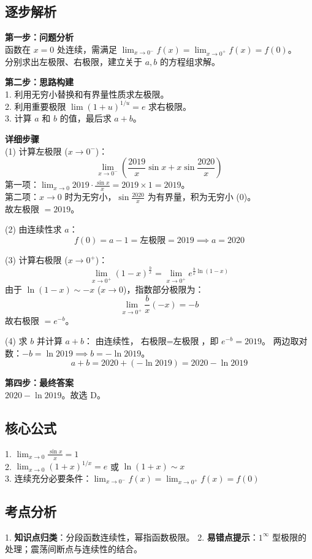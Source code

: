 \documentclass[10pt, a4paper]{ctexart}
\newcommand{\analysisheader}{
    \vspace{0.2cm}
    \noindent{\color{red}\rule[0.5ex]{\linewidth}{0.5pt}} %
    \vspace{0.1cm}
}
\begin{document}
\analysisheader
{\color{red}
\subsection*{逐步解析}
\textbf{第一步：问题分析} \\
函数在 $x=0$ 处连续，需满足 $\lim_{x\to 0^-} f(x) = \lim_{x\to 0^+} f(x) = f(0)$。 \\
分别求出左极限、右极限，建立关于 $a, b$ 的方程组求解。

\textbf{第二步：思路构建} \\
1. 利用无穷小替换和有界量性质求左极限。 \\
2. 利用重要极限 $\lim (1+u)^{1/u} = e$ 求右极限。 \\
3. 计算 $a$ 和 $b$ 的值，最后求 $a+b$。

\textbf{详细步骤} \\
(1) 计算左极限 ($x \to 0^-$)：
\[ \lim_{x \to 0^-} \left( \frac{2019}{x} \sin x + x \sin \frac{2020}{x} \right) \]
第一项：$\lim_{x \to 0} 2019 \cdot \frac{\sin x}{x} = 2019 \times 1 = 2019$。 \\
第二项：$x \to 0$ 时为无穷小，$\sin \frac{2020}{x}$ 为有界量，积为无穷小 (0)。 \\
故左极限 $= 2019$。

(2) 由连续性求 $a$：
\[ f(0) = a - 1 = \text{左极限} = 2019 \implies a = 2020 \]

(3) 计算右极限 ($x \to 0^+$)：
\[ \lim_{x \to 0^+} (1 - x)^{\frac{b}{x}} = \lim_{x \to 0^+} e^{\frac{b}{x} \ln(1-x)} \]
由于 $\ln(1-x) \sim -x$ ($x \to 0$)，指数部分极限为：
\[ \lim_{x \to 0^+} \frac{b}{x} (-x) = -b \]
故右极限 $= e^{-b}$。

(4) 求 $b$ 并计算 $a+b$：
由连续性，$\text{右极限} = \text{左极限}$，即 $e^{-b} = 2019$。
两边取对数：$-b = \ln 2019 \implies b = -\ln 2019$。
\[ a + b = 2020 + (-\ln 2019) = 2020 - \ln 2019 \]

\textbf{第四步：最终答案} \\
$2020 - \ln 2019$。故选 D。

\subsection*{核心公式}
1. $\lim_{x\to 0} \frac{\sin x}{x} = 1$ \\
2. $\lim_{x\to 0} (1+x)^{1/x} = e$ 或 $\ln(1+x) \sim x$ \\
3. 连续充分必要条件：$\lim_{x\to 0^-} f(x) = \lim_{x\to 0^+} f(x) = f(0)$

\subsection*{考点分析}
1. \textbf{知识点归类}：分段函数连续性，幂指函数极限。
2. \textbf{易错点提示}：$1^\infty$ 型极限的处理；震荡间断点与连续性的结合。
}
\end{document}
